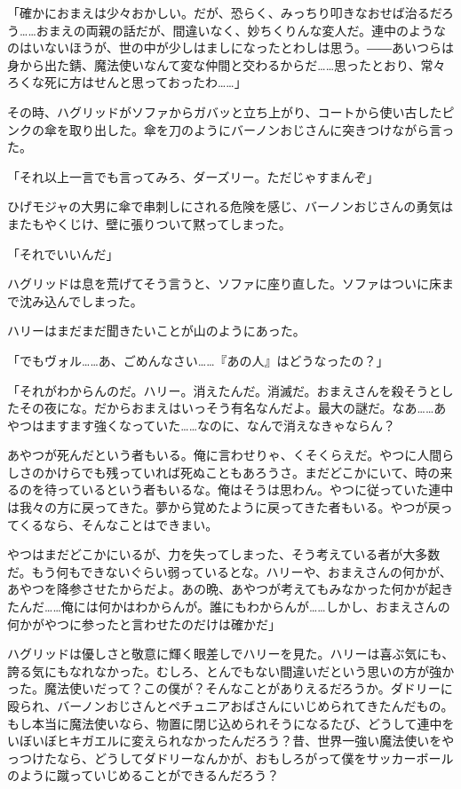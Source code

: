 \documentclass[10pt,a4paper]{article}
\begin{document}
\begin{CJK}{UTF8}{min}
「確かにおまえは少々おかしい。だが、恐らく、みっちり叩きなおせば治るだろう……おまえの両親の話だが、間違いなく、妙ちくりんな変人だ。連中のようなのはいないほうが、世の中が少しはましになったとわしは思う。――あいつらは身から出た錆、魔法使いなんて変な仲間と交わるからだ……思ったとおり、常々ろくな死に方はせんと思っておったわ……」

その時、ハグリッドがソファからガバッと立ち上がり、コートから使い古したピンクの傘を取り出した。傘を刀のようにバーノンおじさんに突きつけながら言った。

「それ以上一言でも言ってみろ、ダーズリー。ただじゃすまんぞ」

ひげモジャの大男に傘で串刺しにされる危険を感じ、バーノンおじさんの勇気はまたもやくじけ、壁に張りついて黙ってしまった。

「それでいいんだ」

ハグリッドは息を荒げてそう言うと、ソファに座り直した。ソファはついに床まで沈み込んでしまった。

ハリーはまだまだ聞きたいことが山のようにあった。

「でもヴォル……あ、ごめんなさい……『あの人』はどうなったの？」

「それがわからんのだ。ハリー。消えたんだ。消滅だ。おまえさんを殺そうとしたその夜にな。だからおまえはいっそう有名なんだよ。最大の謎だ。なあ……あやつはますます強くなっていた……なのに、なんで消えなきゃならん？

あやつが死んだという者もいる。俺に言わせりゃ、くそくらえだ。やつに人間らしさのかけらでも残っていれば死ぬこともあろうさ。まだどこかにいて、時の来るのを待っているという者もいるな。俺はそうは思わん。やつに従っていた連中は我々の方に戻ってきた。夢から覚めたように戻ってきた者もいる。やつが戻ってくるなら、そんなことはできまい。

やつはまだどこかにいるが、力を失ってしまった、そう考えている者が大多数だ。もう何もできないぐらい弱っているとな。ハリーや、おまえさんの何かが、あやつを降参させたからだよ。あの晩、あやつが考えてもみなかった何かが起きたんだ……俺には何かはわからんが。誰にもわからんが……しかし、おまえさんの何かがやつに参ったと言わせたのだけは確かだ」

ハグリッドは優しさと敬意に輝く眼差しでハリーを見た。ハリーは喜ぶ気にも、誇る気にもなれなかった。むしろ、とんでもない間違いだという思いの方が強かった。魔法使いだって？この僕が？そんなことがありえるだろうか。ダドリーに殴られ、バーノンおじさんとペチュニアおばさんにいじめられてきたんだもの。もし本当に魔法使いなら、物置に閉じ込められそうになるたび、どうして連中をいぼいぼヒキガエルに変えられなかったんだろう？昔、世界一強い魔法使いをやっつけたなら、どうしてダドリーなんかが、おもしろがって僕をサッカーボールのように蹴っていじめることができるんだろう？


\end{CJK}
\end{document}
